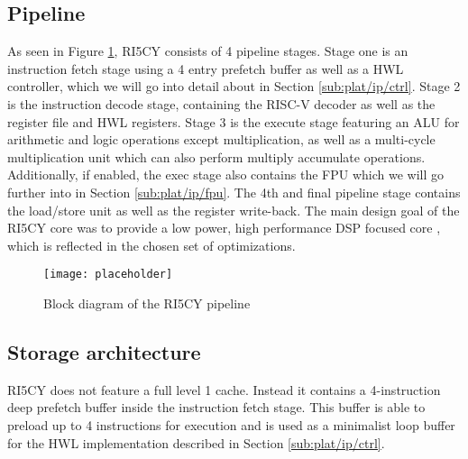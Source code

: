 \documentclass[../bachelor_paper.tex]{subfiles}
\begin{document}
\subsection{Pipeline}
    \label{sec:plat/pipe}
As seen in Figure \ref{fig:plat/base/blockdia}, RI5CY consists of 4 pipeline stages. Stage one is an instruction fetch stage using a 4 entry prefetch buffer as well as a \ac{HWL} controller, which we will go into detail about in Section \ref{sub:plat/ip/ctrl}. Stage 2 is the instruction decode stage, containing the RISC-V decoder as well as the register file and \ac{HWL} registers. Stage 3 is the execute stage featuring an \ac{ALU} for arithmetic and logic operations except multiplication, as well as a multi-cycle multiplication unit which can also perform multiply accumulate operations. Additionally, if enabled, the exec stage also contains the \ac{FPU} which we will go further into in Section \ref{sub:plat/ip/fpu}. The 4th and final pipeline stage contains the load/store unit as well as the register write-back. The main design goal of the RI5CY core was to provide a low power, high performance \ac{DSP} focused core \cite{gautschiNearThresholdRISCVCore2017}, which is reflected in the chosen set of optimizations.

\begin{figure}
    \centering
    \texttt{[image: placeholder]}
    \caption{Block diagram of the RI5CY pipeline}
    \label{fig:plat/base/blockdia}
\end{figure}

\subsection{Storage architecture}
RI5CY does not feature a full level 1 cache. Instead it contains a 4-instruction deep prefetch buffer inside the instruction fetch stage. This buffer is able to preload up to 4 instructions for execution and is used as a minimalist loop buffer for the \ac{HWL} implementation described in Section \ref{sub:plat/ip/ctrl}.
\end{document}
